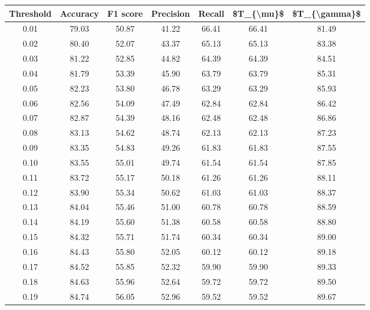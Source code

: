\begin{tabular}{|c|c|c|c|c|c|c|}
\hline
 Threshold &  Accuracy &  F1 score &  Precision &  Recall &  \$T\_\{\textbackslash mu\}\$ &  \$T\_\{\textbackslash gamma\}\$ \\
\hline
      0.01 &     79.03 &     50.87 &      41.22 &   66.41 &      66.41 &         81.49 \\
      0.02 &     80.40 &     52.07 &      43.37 &   65.13 &      65.13 &         83.38 \\
      0.03 &     81.22 &     52.85 &      44.82 &   64.39 &      64.39 &         84.51 \\
      0.04 &     81.79 &     53.39 &      45.90 &   63.79 &      63.79 &         85.31 \\
      0.05 &     82.23 &     53.80 &      46.78 &   63.29 &      63.29 &         85.93 \\
      0.06 &     82.56 &     54.09 &      47.49 &   62.84 &      62.84 &         86.42 \\
      0.07 &     82.87 &     54.39 &      48.16 &   62.48 &      62.48 &         86.86 \\
      0.08 &     83.13 &     54.62 &      48.74 &   62.13 &      62.13 &         87.23 \\
      0.09 &     83.35 &     54.83 &      49.26 &   61.83 &      61.83 &         87.55 \\
      0.10 &     83.55 &     55.01 &      49.74 &   61.54 &      61.54 &         87.85 \\
      0.11 &     83.72 &     55.17 &      50.18 &   61.26 &      61.26 &         88.11 \\
      0.12 &     83.90 &     55.34 &      50.62 &   61.03 &      61.03 &         88.37 \\
      0.13 &     84.04 &     55.46 &      51.00 &   60.78 &      60.78 &         88.59 \\
      0.14 &     84.19 &     55.60 &      51.38 &   60.58 &      60.58 &         88.80 \\
      0.15 &     84.32 &     55.71 &      51.74 &   60.34 &      60.34 &         89.00 \\
      0.16 &     84.43 &     55.80 &      52.05 &   60.12 &      60.12 &         89.18 \\
      0.17 &     84.52 &     55.85 &      52.32 &   59.90 &      59.90 &         89.33 \\
      0.18 &     84.63 &     55.96 &      52.64 &   59.72 &      59.72 &         89.50 \\
      0.19 &     84.74 &     56.05 &      52.96 &   59.52 &      59.52 &         89.67 \\

\end{tabular}
